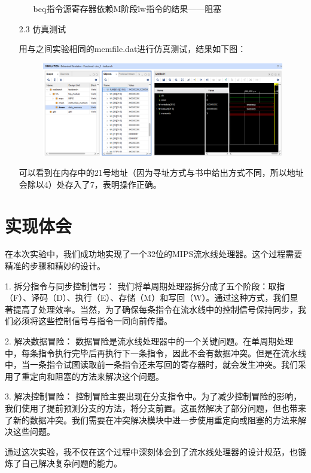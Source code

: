 \documentclass[UTF8]{article}
\begin{document}
\begin{enumerate}
\begin{enumerate}
					beq指令源寄存器依赖M阶段lw指令的结果——阻塞
			\end{enumerate}
		\item [2.3] 仿真测试
			\par 用与之间实验相同的memfile.dat进行仿真测试，结果如下图：
			\begin{figure}[htbp]
				\centering
				\includegraphics[scale=0.25]{2-3.png}
			\end{figure}
			\par 可以看到在内存中的21号地址（因为寻址方式与书中给出方式不同，所以地址会除以4）处存入了7，表明操作正确。
	\end{enumerate}
	\section{实现体会}
		\par 
		在本次实验中，我们成功地实现了一个32位的MIPS流水线处理器。这个过程需要精准的步骤和精妙的设计。
		
		1. 拆分指令与同步控制信号：
		我们将单周期处理器拆分成了五个阶段：取指（F）、译码（D）、执行（E）、存储（M）和写回（W）。通过这种方式，我们显著提高了处理效率。当然，为了确保每条指令在流水线中的控制信号保持同步，我们必须将这些控制信号与指令一同向前传播。
		
		2. 解决数据冒险：
		数据冒险是流水线处理器中的一个关键问题。在单周期处理中，每条指令执行完毕后再执行下一条指令，因此不会有数据冲突。但是在流水线中，当一条指令试图读取前一条指令还未写回的寄存器时，就会发生冲突。我们采用了重定向和阻塞的方法来解决这个问题。
		
		3. 解决控制冒险：
		控制冒险主要出现在分支指令中。为了减少控制冒险的影响，我们使用了提前预测分支的方法，将分支前置。这虽然解决了部分问题，但也带来了新的数据冲突。我们需要在冲突解决模块中进一步使用重定向或阻塞的方法来解决这些问题。
		
		通过这次实验，我不仅在这个过程中深刻体会到了流水线处理器的设计规范，也锻炼了自己解决复杂问题的能力。
\end{document}
